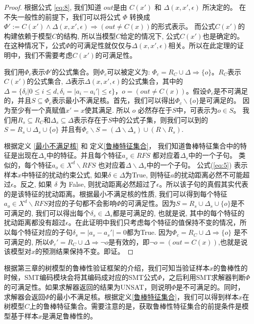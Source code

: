 \begin{proof}
根据公式 \ref{eq:8}, 我们知道 $out$是由 $C(x')$ 和 $\Delta(x,x',\epsilon)$ 所决定的。 在不失一般性的前提下，我们可以将公式 $\Phi$ 转换成 $\Phi':=C(x')\land \Delta(x,x',\epsilon)\Rightarrow (out \ne C(x))$的形式表示。 而公式$C(x')$的构建依赖于模型$C$的结构, 所以当模型$C$给定的情况下, 公式$C(x')$也是确定的。 在这种情况下，公式$\Phi$的可满足性就仅仅与$\Delta(x,x',\epsilon)$相关。所以在此定理的证明中，我们不需要考虑$C(x')$的可满足性。

我们用$\Phi_c$表示$\Phi'$的公式集合。则$\Phi_c$可以被定义为: $\Phi_c =R_C \cup \Delta \Rightarrow \{o\}$。$R_C$表示$C(x')$的公式集合, $\Delta$表示$\Delta(x, x', \epsilon)$的公式集合，其中的$\Delta=\{\delta_i|0\le i\le d, \delta_i=|a_i-a_i'|\le \epsilon\}$，$o= (out\ne C(x))$。假设$\Phi_c$是不可满足的，并且$S \subseteq \Phi_c$表示最小不满足核。首先，我们可以得出$\Phi_c\backslash\{o\}$是可满足的。 因为至少有一个真赋值$x'= x$使其满足. 所以 $o$ 必然存在于$S$中，可表示为$o\in S$。  我们用$R_s \subseteq R_C$和$\Delta_s \subseteq \Delta$表示存在于$S$中的公式子集，则我们可以到的$S = R_s\cup\Delta_s\cup \{o\}$ 并且有$\Phi_c \backslash S = (\Delta \backslash \Delta_s) \cup (R\backslash R_s)$. 

根据定义 \ref{最小不满足核} 和 定义\ref{鲁棒特征集合}， 我们知道鲁棒特征集合中的特征是出现在$\Delta_s$中的特征。并且每个特征$a_s \in RFS$ 都对应着$\Delta_s$中的一个子句。 类似的，每个特征$a_o\in X^d\backslash RFS$ 也对应着$\Delta\backslash \Delta_s$中的一个子句。
公式(\ref{eq:5}) 表示样本$x$中特征的扰动约束公式, 如果$\delta \in \Delta$为True, 则特征$a$的扰动距离必然不可能超过$\epsilon$。反之, 如果 $\delta$ 为 False, 则扰动距离必然超过了$\epsilon$。所以该子句的真假其实代表的是该特征的扰动距离。根据最小不满足核的性质, 我们可以得到每个特征$a_o\in X^d\backslash RFS$对应的子句都不会影响$\Phi$的可满足性。因为$S = R_s\cup\Delta_s\cup \{o\}$是不可满足的, 我们可以得出每个$\delta_s \in \Delta_s$都是可满足的, 也就是说, 其中的每个特征的扰动距离都没有超过$\epsilon$。在此证明中我们只考虑每个特征的值保持不变的情况，所以每个特征对应的子句$\delta_s=|a_s-a_s'|=0$都为True. 因为$\Phi_c =R_C \cup \Delta \Rightarrow \{o\}$ 是不可满足的, 所以$\Phi_c'=R_C\cup\Delta\Rightarrow\lnot o$是有效的，即$\lnot o=(out=C(x))$,也就是说该模型对$x$的预测结果保持不变。即证。
\end{proof}

根据第三章的树模型的鲁棒性验证框架的介绍，我们可知当验证样本$x$的鲁棒性的时候，SMT编码模块会将其编码成对应的SMT公式$\Phi$，之后利用SMT求解器判断$\Phi$的可满足性。如果求解器返回的结果为UNSAT，则说明$\Phi$是不可满足的。同时，求解器会返回$\Phi$的最小不满足核。根据定义\ref{鲁棒特征集合}，我们可以得到样本$x$在树模型$C$上的鲁棒特征集合。需要注意的是，获取鲁棒性特征集合的前提条件是模型基于样本$x$是满足鲁棒性的。

